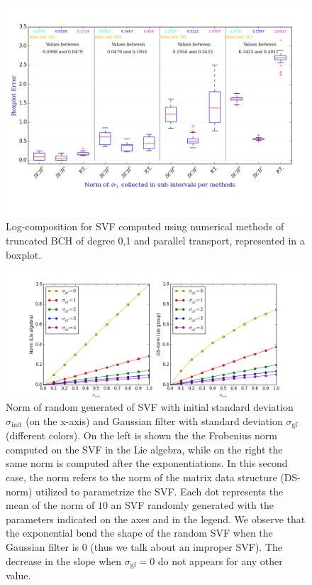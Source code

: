 \begin{figure}[!ht]
	\hspace{-2cm}
	\includegraphics[scale=0.69]{figures/SVF_boxplot.png}
	\caption{Log-composition for SVF computed using numerical methods of truncated BCH of degree 0,1 and parallel transport, represented in a boxplot.}
	\label{fig:SVF_boxplot}
\end{figure}

\begin{figure}[!ht]
	\hspace{-2.5cm}
	\includegraphics[scale=0.6]{figures/SVF_sigma_means_comparisons.png}
	\caption{Norm of random generated of SVF with initial standard deviation $\sigma_{\text{init}}$ (on the x-axis) and Gaussian filter with standard deviation $\sigma_{\text{gf}}$ (different colors). On the left is shown the the Frobenius norm computed on the SVF in the Lie algebra, while on the right the same norm is computed after the exponentiations. In this second case, the norm refers to the norm of the matrix data structure (DS-norm) utilized to parametrize the SVF. Each dot represents the mean of the norm of $10$ an SVF randomly generated with the parameters indicated on the axes and in the legend. We observe that the exponential bend the shape of the random SVF when the Gaussian filter is $0$ (thus we talk about an improper SVF). The decrease in the slope when $\sigma_{\text{gf}}=0$ do not appears for any other value.}
	\label{fig:SVF_sigma_means_comparisons}
\end{figure}





